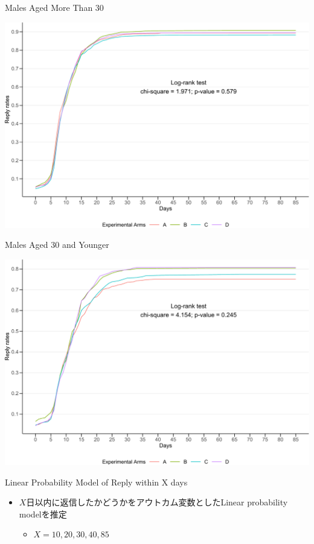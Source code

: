 \documentclass[
      aspectratio=169,
        12pt,
    ]{beamer}
\providecommand{\tightlist}{%
  \setlength{\itemsep}{0pt}\setlength{\parskip}{0pt}}
\begin{document}
\begin{frame}{Males Aged More Than 30}
\protect\hypertarget{males-aged-more-than-30}{}
\begin{center}\includegraphics[width=0.75\linewidth]{report_files/figure-beamer/plot-surv-male-over30-1} \end{center}
\end{frame}

\begin{frame}{Males Aged 30 and Younger}
\protect\hypertarget{males-aged-30-and-younger}{}
\begin{center}\includegraphics[width=0.75\linewidth]{report_files/figure-beamer/plot-surv-male-under30-1} \end{center}
\end{frame}

\begin{frame}{Linear Probability Model of Reply within X days}
\protect\hypertarget{linear-probability-model-of-reply-within-x-days}{}
\begin{itemize}
\tightlist
\item
  \(X\)日以内に返信したかどうかをアウトカム変数としたLinear probability modelを推定

  \begin{itemize}
  \tightlist
  \item
    \(X = 10, 20, 30, 40, 85\)
  \end{itemize}
\end{itemize}
\end{frame}
\end{document}
